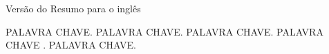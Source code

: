 
\abstract

Versão do Resumo para o inglês

\begin{keywords}
 PALAVRA CHAVE.  PALAVRA CHAVE.  PALAVRA CHAVE. PALAVRA CHAVE . PALAVRA CHAVE.
\end{keywords}